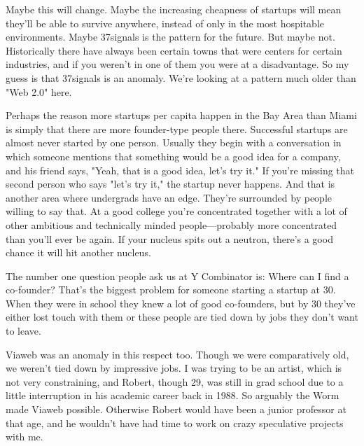 Maybe this will change. Maybe the increasing
                    cheapness of startups will mean they'll be able to survive
                    anywhere, instead of only in the most hospitable
                    environments. Maybe 37signals is the pattern for the future.
                    But maybe not. Historically there have always been certain
                    towns that were centers for certain industries, and if you
                    weren't in one of them you were at a disadvantage. So my
                    guess is that 37signals is an anomaly. We're looking at a
                    pattern much older than "Web 2.0" here.

Perhaps
                    the reason more startups per capita happen in the Bay Area
                    than Miami is simply that there are more founder-type people
                    there. Successful startups are almost never started by one
                    person. Usually they begin with a conversation in which
                    someone mentions that something would be a good idea for a
                    company, and his friend says, "Yeah, that is a good idea,
                    let's try it." If you're missing that second person who says
                    "let's try it," the startup never happens. And that is
                    another area where undergrads have an edge. They're
                    surrounded by people willing to say that. At a good college
                    you're concentrated together with a lot of other ambitious
                    and technically minded people---probably more
                    concentrated than you'll ever be again. If your nucleus
                    spits out a neutron, there's a good chance it will hit
                    another nucleus.

The number one question people
                    ask us at Y Combinator is: Where can I find a co-founder?
                    That's the biggest problem for someone starting a startup at
                    30. When they were in school they knew a lot of good
                    co-founders, but by 30 they've either lost touch with them
                    or these people are tied down by jobs they don't want to
                    leave.

Viaweb was an anomaly in this respect too.
                    Though we were comparatively old, we weren't tied down by
                    impressive jobs. I was trying to be an artist, which is not
                    very constraining, and Robert, though 29, was still in grad
                    school due to a little interruption in his academic career
                    back in 1988. So arguably the Worm made Viaweb possible.
                    Otherwise Robert would have been a junior professor at that
                    age, and he wouldn't have had time to work on crazy
                    speculative projects with me.

